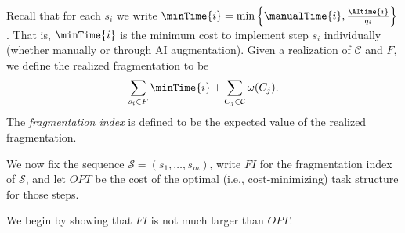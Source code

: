 Recall that for each $s_i$ we write $\minTime{i} = \min\left\{\manualTime{i}, \frac{\AItime{i}}{q_i}\right\}$.
That is, $\minTime{i}$ is the minimum cost to implement step $s_i$ individually (whether manually or through AI augmentation).
Given a realization of $\mathcal{C}$ and $F$, we define the realized fragmentation to be
\[ \sum_{s_i \in F}\minTime{i} + \sum_{C_j \in \mathcal{C}} \omega(C_j).\]
The \emph{fragmentation index} is defined to be the expected value of the realized fragmentation.

We now fix the sequence $\mathcal{S} = (s_1, \dotsc, s_m)$, write $FI$ for the fragmentation index of $\mathcal{S}$, and let $OPT$ be the cost of the optimal (i.e., cost-minimizing) task structure for those steps.

We begin by showing that $FI$ is not much larger than $OPT$.

